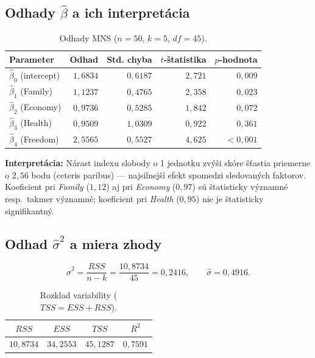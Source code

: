 \documentclass[12pt,a4paper]{article}
\begin{document}
\subsection*{Odhady $\hat{\beta}$ a ich interpretácia}

\begin{table}[h!]
\centering
\begin{tabular}{lrrrr}
\toprule
Parameter & Odhad & Std. chyba & $t$-štatistika & $p$-hodnota \\
\midrule
$\hat{\beta}_0$ (intercept) & $1{,}6834$ & $0{,}6187$ & $2{,}721$ & $0{,}009$ \\
$\hat{\beta}_1$ (Family)    & $1{,}1237$ & $0{,}4765$ & $2{,}358$ & $0{,}023$ \\
$\hat{\beta}_2$ (Economy)   & $0{,}9736$ & $0{,}5285$ & $1{,}842$ & $0{,}072$ \\
$\hat{\beta}_3$ (Health)    & $0{,}9509$ & $1{,}0309$ & $0{,}922$ & $0{,}361$ \\
$\hat{\beta}_4$ (Freedom)   & $2{,}5565$ & $0{,}5527$ & $4{,}625$ & $<0{,}001$ \\
\bottomrule
\end{tabular}
\caption{Odhady MNS ($n=50$, $k=5$, $df = 45$).}
\end{table}

\textbf{Interpretácia:} Nárast indexu slobody o 1 jednotku zvýši
skóre šťastia priemerne o $2{,}56$ bodu (ceteris paribus) --- najsilnejší
efekt spomedzi sledovaných faktorov. Koeficient pri \textit{Family}
($1{,}12$) aj pri \textit{Economy} ($0{,}97$) sú štatisticky
významné resp.\ takmer významné; koeficient pri \textit{Health}
($0{,}95$) nie je štatisticky signifikantný.

\subsection*{Odhad $\hat{\sigma}^2$ a miera zhody}

\[
  \hat{\sigma}^2 = \frac{RSS}{n-k} = \frac{10{,}8734}{45} = 0{,}2416,
  \qquad \hat{\sigma} = 0{,}4916.
\]

\begin{table}[h!]
\centering
\begin{tabular}{cccc}
\toprule
$RSS$ & $ESS$ & $TSS$ & $R^2$ \\
\midrule
$10{,}8734$ & $34{,}2553$ & $45{,}1287$ & $0{,}7591$ \\
\bottomrule
\end{tabular}
\caption{Rozklad variability ($TSS = ESS + RSS$).}
\end{table}
\end{document}
